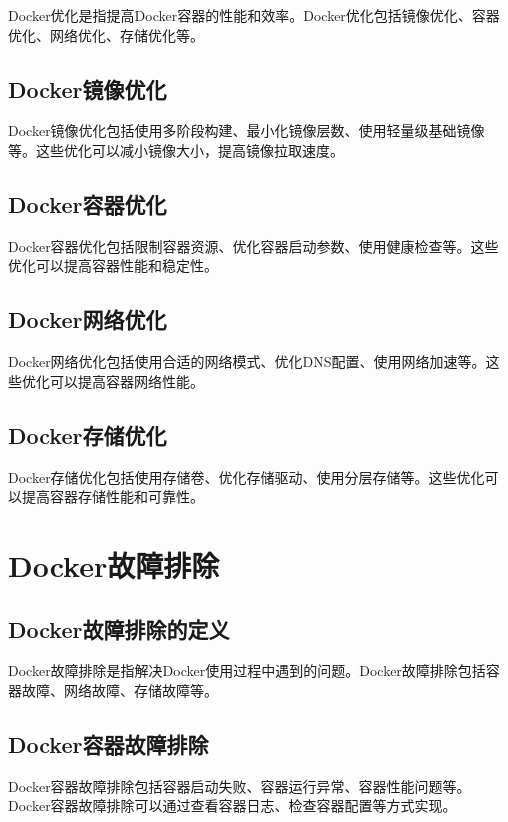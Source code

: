 \documentclass[12pt,UTF8]{ctexbook}
\begin{document}
Docker优化是指提高Docker容器的性能和效率。Docker优化包括镜像优化、容器优化、网络优化、存储优化等。

\section{Docker镜像优化}

Docker镜像优化包括使用多阶段构建、最小化镜像层数、使用轻量级基础镜像等。这些优化可以减小镜像大小，提高镜像拉取速度。

\section{Docker容器优化}

Docker容器优化包括限制容器资源、优化容器启动参数、使用健康检查等。这些优化可以提高容器性能和稳定性。

\section{Docker网络优化}

Docker网络优化包括使用合适的网络模式、优化DNS配置、使用网络加速等。这些优化可以提高容器网络性能。

\section{Docker存储优化}

Docker存储优化包括使用存储卷、优化存储驱动、使用分层存储等。这些优化可以提高容器存储性能和可靠性。

\chapter{Docker故障排除}

\section{Docker故障排除的定义}

Docker故障排除是指解决Docker使用过程中遇到的问题。Docker故障排除包括容器故障、网络故障、存储故障等。

\section{Docker容器故障排除}

Docker容器故障排除包括容器启动失败、容器运行异常、容器性能问题等。Docker容器故障排除可以通过查看容器日志、检查容器配置等方式实现。
\end{document}
